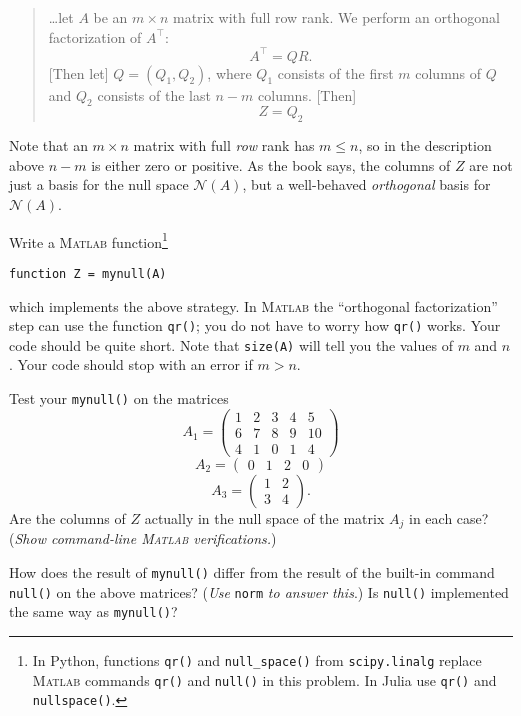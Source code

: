 \documentclass[12pt]{amsart}
\newcommand{\Matlab}{\textsc{Matlab}\xspace}
\begin{document}
\begin{quote}
\dots let $A$ be an $m\times n$ matrix with full row rank.  We perform an orthogonal factorization of $A^\top$:
    $$A^\top = QR.$$
[Then let] $Q=(Q_1,Q_2)$, where $Q_1$ consists of the first $m$ columns of $Q$ and $Q_2$ consists of the last $n-m$ columns.  [Then]
    $$Z = Q_2$$
\end{quote}

\noindent Note that an $m\times n$ matrix with full \emph{row} rank has $m\le n$, so in the description above $n-m$ is either zero or positive.  As the book says, the columns of $Z$ are not just a basis for the null space $\mathcal{N}(A)$, but a well-behaved \emph{orthogonal} basis for $\mathcal{N}(A)$.

Write a \Matlab function\footnote{In Python, functions \texttt{qr()} and \texttt{null\_space()} from \texttt{scipy.linalg} replace \Matlab commands \texttt{qr()} and \texttt{null()} in this problem.  In Julia use \texttt{qr()} and \texttt{nullspace()}.}

\centerline{\texttt{function Z = mynull(A)}}

\noindent which implements the above strategy.  In \Matlab the ``orthogonal factorization'' step can use the function \verb|qr()|; you do not have to worry how \verb|qr()| works.  Your code should be quite short.  Note that \verb|size(A)| will tell you the values of $m$ and $n$.  Your code should stop with an error if $m>n$.

Test your \verb|mynull()| on the matrices
    $$A_1 = \begin{pmatrix}
    1 & 2 & 3 & 4 & 5 \\
    6 & 7 & 8 & 9 & 10 \\
    4 & 1 & 0 & 1 & 4
    \end{pmatrix}$$
    $$A_2 = \begin{pmatrix} 0 & 1 & 2 & 0 \end{pmatrix}$$
    $$A_3 = \begin{pmatrix} 1 & 2 \\ 3 & 4 \end{pmatrix}.$$
Are the columns of $Z$ actually in the null space of the matrix $A_j$ in each case?  (\emph{Show command-line \Matlab verifications.})

How does the result of \verb|mynull()| differ from the result of the built-in command \verb|null()| on the above matrices?  (\emph{Use} \verb|norm| \emph{to answer this}.)  Is \verb|null()| implemented the same way as \verb|mynull()|?
\end{document}
